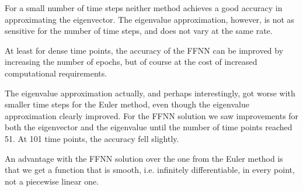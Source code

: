 For a small number of time steps neither method achieves a good accuracy in approximating the eigenvector. The eigenvalue approximation, however, is not as sensitive for the number of time steps, and does not vary at the same rate.

At least for dense time points, the accuracy of the FFNN can be improved by increasing the number of epochs, but of course at the cost of increased computational requirements.

The eigenvalue approximation actually, and perhaps interestingly, got worse with smaller time steps for the Euler method, even though the eigenvalue approximation clearly improved. For the FFNN solution we saw improvements for both the eigenvector and the eigenvalue until the number of time points reached 51. At 101 time points, the accuracy fell slightly.

An advantage with the FFNN solution over the one from the Euler method is that we get a function that is smooth, i.e. infinitely differentiable, in every point, not a piecewise linear one.

